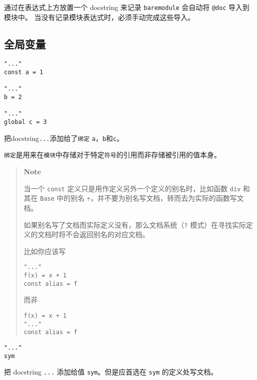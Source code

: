 通过在表达式上方放置一个 docstring 来记录 \texttt{baremodule} 会自动将 \texttt{@doc} 导入到模块中。 当没有记录模块表达式时，必须手动完成这些导入。



\hypertarget{17299710876257759093}{}


\subsection{全局变量}




\begin{verbatim}
"..."
const a = 1

"..."
b = 2

"..."
global c = 3
\end{verbatim}



把docstring\texttt{{\textquotedbl}...{\textquotedbl}}添加给了\texttt{绑定} \texttt{a}，\texttt{b}和\texttt{c}。



\texttt{绑定}是用来在\texttt{模块}中存储对于特定\texttt{符号}的引用而非存储被引用的值本身。



\begin{quote}
\textbf{Note}

当一个 \texttt{const} 定义只是用作定义另外一个定义的别名时，比如函数 \texttt{div} 和其在 \texttt{Base} 中的别名 \texttt{÷}，并不要为别名写文档，转而去为实际的函数写文档。

如果别名写了文档而实际定义没有，那么文档系统（\texttt{?} 模式）在寻找实际定义的文档时将不会返回别名的对应文档。

比如你应该写


\begin{verbatim}
"..."
f(x) = x + 1
const alias = f
\end{verbatim}

而非


\begin{verbatim}
f(x) = x + 1
"..."
const alias = f
\end{verbatim}

\end{quote}



\begin{verbatim}
"..."
sym
\end{verbatim}



把 docstring \texttt{{\textquotedbl}...{\textquotedbl}} 添加给值 \texttt{sym}。但是应首选在 \texttt{sym} 的定义处写文档。



